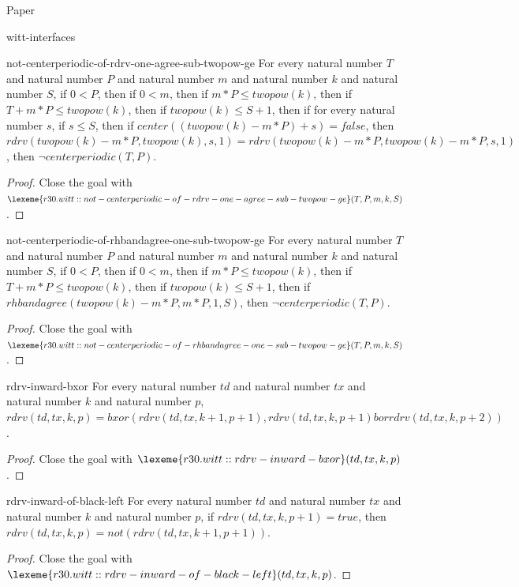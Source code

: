 \begin{lexlean}{Paper}
\begin{section}{witt-interfaces}
  \begin{theorem}{not-centerperiodic-of-rdrv-one-agree-sub-twopow-ge}
  For every natural number \(T\) and natural number \(P\) and natural number \(m\) and natural number \(k\) and natural number \(S\), if \(0 < P\), then if \(0 < m\), then if \(m * P ≤ twopow(k)\), then if \(T + m * P ≤ twopow(k)\), then if \(twopow(k) ≤ S + 1\), then if for every natural number \(s\), if \(s ≤ S\), then if \(center((twopow(k) - m * P) + s) = false\), then \(rdrv(twopow(k) - m * P, twopow(k), s, 1) = rdrv(twopow(k) - m * P, twopow(k) - m * P, s, 1)\), then \(¬ centerperiodic(T, P)\).
  \begin{proof}
  Close the goal with \(\lexeme{r30.witt::not-centerperiodic-of-rdrv-one-agree-sub-twopow-ge}(T, P, m, k, S)\).
  \end{proof}
  \end{theorem}

  \begin{theorem}{not-centerperiodic-of-rhbandagree-one-sub-twopow-ge}
  For every natural number \(T\) and natural number \(P\) and natural number \(m\) and natural number \(k\) and natural number \(S\), if \(0 < P\), then if \(0 < m\), then if \(m * P ≤ twopow(k)\), then if \(T + m * P ≤ twopow(k)\), then if \(twopow(k) ≤ S + 1\), then if \(rhbandagree(twopow(k) - m * P, m * P, 1, S)\), then \(¬ centerperiodic(T, P)\).
  \begin{proof}
  Close the goal with \(\lexeme{r30.witt::not-centerperiodic-of-rhbandagree-one-sub-twopow-ge}(T, P, m, k, S)\).
  \end{proof}
  \end{theorem}

  \begin{theorem}{rdrv-inward-bxor}
  For every natural number \(td\) and natural number \(tx\) and natural number \(k\) and natural number \(p\), \(rdrv(td, tx, k, p) = bxor(rdrv(td, tx, k + 1, p + 1), rdrv(td, tx, k, p + 1) bor rdrv(td, tx, k, p + 2))\).
  \begin{proof}
  Close the goal with \(\lexeme{r30.witt::rdrv-inward-bxor}(td, tx, k, p)\).
  \end{proof}
  \end{theorem}

  \begin{theorem}{rdrv-inward-of-black-left}
  For every natural number \(td\) and natural number \(tx\) and natural number \(k\) and natural number \(p\), if \(rdrv(td, tx, k, p + 1) = true\), then \(rdrv(td, tx, k, p) = not(rdrv(td, tx, k + 1, p + 1))\).
  \begin{proof}
  Close the goal with \(\lexeme{r30.witt::rdrv-inward-of-black-left}(td, tx, k, p)\).
  \end{proof}
  \end{theorem}


\end{section}
\end{lexlean}
